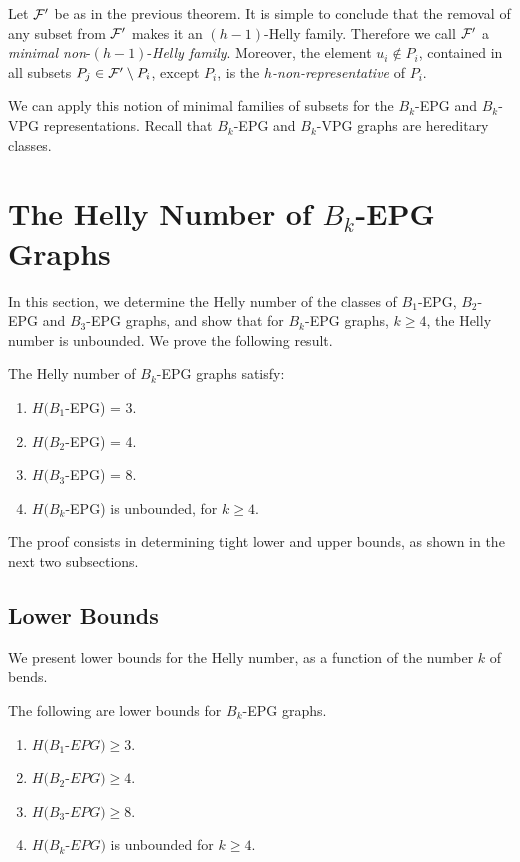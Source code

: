 Let $\cal{ F'}$ be as in the previous theorem. It is simple to conclude that the removal of any subset from $\cal {F'}$ makes it an $(h-1)$-Helly family. Therefore we  call $\cal {F'}$ a {\it minimal non}-$(h-1)$-{\it Helly family}. Moreover, the element $u_i \not \in P_i$, contained in all subsets $P_j \in {\cal{F'}} \setminus P_i$, except $P_i$, is the {\it $h$-non-representative} of $P_i$.  

We can apply this notion of minimal families of subsets for the $B_k$-EPG and $B_k$-VPG representations. Recall that $B_k$-EPG and $B_k$-VPG graphs are hereditary classes. 

\section{The Helly Number of $B_k$-EPG Graphs}\label{sec:Helly-number}

In this section, we determine the Helly number of the classes of $B_1$-EPG, $B_2$-EPG and $B_3$-EPG graphs, and show that for $B_k$-EPG graphs, $k \geq 4$, the Helly number is unbounded. We prove the following result.

\begin{theorem}\label{thm:Helly-EPG}
The Helly number of $B_k$-EPG graphs satisfy:
\begin{enumerate}[nosep,label=\emph{(\roman*)}]
\item  $H(B_1$-EPG) = 3.
\item $H(B_2$-EPG)  = 4. 
\item $H(B_3$-EPG)  = 8. 
\item $H(B_k$-EPG) is unbounded, for 
$k \geq 4$.
\end{enumerate}

\end{theorem}

The proof consists in determining tight lower and upper bounds, as shown in the next two subsections. 

\subsection{Lower Bounds}

We present lower bounds for the Helly number, as a function of the number $k$ of bends.

\begin{claim}\label{claim:lower-Bk-EPG} 
The following are lower bounds for $B_k$-EPG graphs.
\begin{enumerate}[nosep,label=\emph{(\roman*)}]
\item   $H(B_1$-$EPG) \geq 3$. 
\item $H(B_2$-$EPG) \geq 4$. 
\item $H(B_3$-$EPG) \geq 8$. 
\item $H(B_k$-$EPG )$ is unbounded for $k \geq 4$.
\end{enumerate}
\end{claim}

